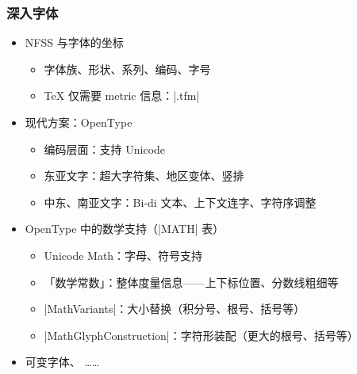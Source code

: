 \begin{frame}[fragile]
\frametitle{深入字体}
\begin{itemize}
  \item<+-> NFSS 与字体的坐标

    \begin{itemize}
      \item 字体族、形状、系列、编码、字号
      \item \TeX{} 仅需要 metric 信息：|.tfm|
    \end{itemize}

  \item<+-> 现代方案：OpenType

    \begin{itemize}
      \item 编码层面：支持 Unicode
      \item 东亚文字：超大字符集、地区变体、竖排
      \item 中东、南亚文字：Bi-di 文本、上下文连字、字符序调整
    \end{itemize}

  \item<+-> OpenType 中的数学支持（|MATH| 表）

    \begin{itemize}
      \item Unicode Math：字母、符号支持
      \item 「数学常数」：整体度量信息——上下标位置、分数线粗细等
      \item |MathVariants|：大小替换（积分号、根号、括号等）
      \item |MathGlyphConstruction|：字符形装配（更大的根号、括号等）
    \end{itemize}

  \item<+-> 可变字体、
    ……
\end{itemize}
\end{frame}

